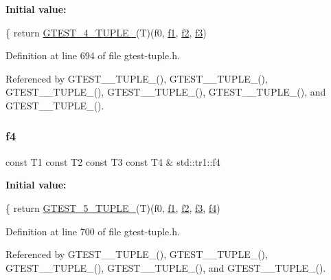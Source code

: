 {\bfseries Initial value\+:}
\begin{DoxyCode}
\{
  \textcolor{keywordflow}{return} \hyperlink{gtest-tuple_8h_a3625feb24d5e6eb9926fd558e4a2e3ff}{GTEST\_4\_TUPLE\_}(T)(f0, \hyperlink{namespacestd_1_1tr1_a9c0fa65b105f8e2f58ba59ecf75fd000}{f1}, \hyperlink{namespacestd_1_1tr1_a87dd9e009868361317f587126dba63d4}{f2}, \hyperlink{namespacestd_1_1tr1_a0f7c3b47d27d42d82d1a333ea420ce4e}{f3})
\end{DoxyCode}


Definition at line 694 of file gtest-\/tuple.\+h.



Referenced by G\+T\+E\+S\+T\+\_\+\_\+\+T\+U\+P\+L\+E\+\_\+(), G\+T\+E\+S\+T\+\_\+\_\+\+T\+U\+P\+L\+E\+\_\+(), G\+T\+E\+S\+T\+\_\+\_\+\+T\+U\+P\+L\+E\+\_\+(), G\+T\+E\+S\+T\+\_\+\_\+\+T\+U\+P\+L\+E\+\_\+(), G\+T\+E\+S\+T\+\_\+\_\+\+T\+U\+P\+L\+E\+\_\+(), and G\+T\+E\+S\+T\+\_\+\_\+\+T\+U\+P\+L\+E\+\_\+().

\mbox{\label{namespacestd_1_1tr1_adc796e02b7385d526aff708189564f67}} 
\subsubsection{\texorpdfstring{f4}{f4}}
{\footnotesize\ttfamily const T1 const T2 const T3 const T4 \& std\+::tr1\+::f4}

{\bfseries Initial value\+:}
\begin{DoxyCode}
\{
  \textcolor{keywordflow}{return} \hyperlink{gtest-tuple_8h_a64e6f4a4cf55f62cde94066c6d5d5c74}{GTEST\_5\_TUPLE\_}(T)(f0, \hyperlink{namespacestd_1_1tr1_a9c0fa65b105f8e2f58ba59ecf75fd000}{f1}, \hyperlink{namespacestd_1_1tr1_a87dd9e009868361317f587126dba63d4}{f2}, \hyperlink{namespacestd_1_1tr1_a0f7c3b47d27d42d82d1a333ea420ce4e}{f3}, \hyperlink{namespacestd_1_1tr1_adc796e02b7385d526aff708189564f67}{f4})
\end{DoxyCode}


Definition at line 700 of file gtest-\/tuple.\+h.



Referenced by G\+T\+E\+S\+T\+\_\+\_\+\+T\+U\+P\+L\+E\+\_\+(), G\+T\+E\+S\+T\+\_\+\_\+\+T\+U\+P\+L\+E\+\_\+(), G\+T\+E\+S\+T\+\_\+\_\+\+T\+U\+P\+L\+E\+\_\+(), G\+T\+E\+S\+T\+\_\+\_\+\+T\+U\+P\+L\+E\+\_\+(), and G\+T\+E\+S\+T\+\_\+\_\+\+T\+U\+P\+L\+E\+\_\+().

\mbox{\label{namespacestd_1_1tr1_a9c1eb66b2b2fa321942af95405232a0d}} 
